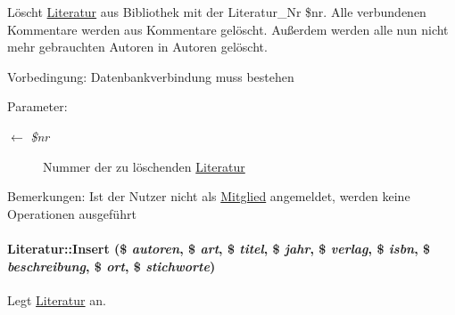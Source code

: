 Löscht \hyperlink{classLiteratur}{Literatur} aus Bibliothek mit der Literatur\_\-Nr \$nr. Alle verbundenen Kommentare werden aus Kommentare gelöscht. Außerdem werden alle nun nicht mehr gebrauchten Autoren in Autoren gelöscht. \begin{Desc}
\item[Vorbedingung:]Datenbankverbindung muss bestehen \end{Desc}
\begin{Desc}
\item[Parameter:]
\begin{description}
\item[\mbox{$\leftarrow$} {\em \$nr}]Nummer der zu löschenden \hyperlink{classLiteratur}{Literatur} \end{description}
\end{Desc}
\begin{Desc}
\item[Bemerkungen:]Ist der Nutzer nicht als \hyperlink{classMitglied}{Mitglied} angemeldet, werden keine Operationen ausgeführt \end{Desc}
\hypertarget{classLiteratur_3347551316e8f73659fc6f32ac6095df}{
\paragraph[Insert]{\setlength{\rightskip}{0pt plus 5cm}Literatur::Insert (\$ {\em autoren}, \$ {\em art}, \$ {\em titel}, \$ {\em jahr}, \$ {\em verlag}, \$ {\em isbn}, \$ {\em beschreibung}, \$ {\em ort}, \$ {\em stichworte})}\hfill}
\label{classLiteratur_3347551316e8f73659fc6f32ac6095df}


Legt \hyperlink{classLiteratur}{Literatur} an. 

